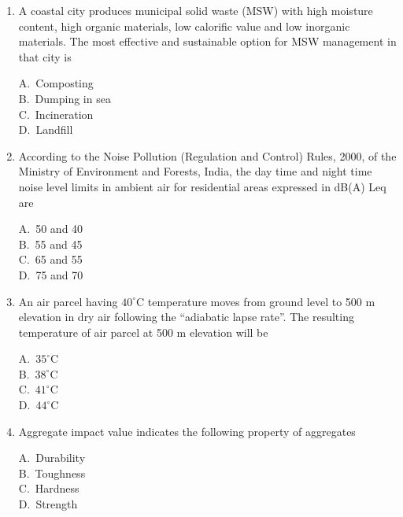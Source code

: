 \documentclass[journal,12pt,onecolumn]{IEEEtran}
\theoremstyle{remark}
\begin{document}
\begin{enumerate}
\noindent\item A coastal city produces municipal solid waste (MSW) with high moisture content, high organic materials, low calorific value and low inorganic materials. The most effective and sustainable option for MSW management in that city is
\hfill{}
\begin{multicols}{4}
A.\ Composting \\
B.\ Dumping in sea \\
C.\ Incineration \\
D.\ Landfill
\end{multicols}

\noindent\item According to the Noise Pollution (Regulation and Control) Rules, 2000, of the Ministry of Environment and Forests, India, the day time and night time noise level limits in ambient air for residential areas expressed in dB(A) Leq are
\hfill{}
\begin{multicols}{4}
A.\ 50 and 40 \\
B.\ 55 and 45 \\
C.\ 65 and 55 \\
D.\ 75 and 70
\end{multicols}

\setlength{\parindent}{0pt}
\setlength{\parskip}{0.5cm}


\noindent\item An air parcel having $40^\circ\mathrm{C}$ temperature moves from ground level to 500 m elevation in dry air following the ``adiabatic lapse rate''. The resulting temperature of air parcel at 500 m elevation will be
\hfill{}
\begin{multicols}{4}
A.\ $35^\circ\mathrm{C}$ \\
B.\ $38^\circ\mathrm{C}$ \\
C.\ $41^\circ\mathrm{C}$ \\
D.\ $44^\circ\mathrm{C}$
\end{multicols}

\noindent\item Aggregate impact value indicates the following property of aggregates
\hfill{}
\begin{multicols}{4}
A.\ Durability \\
B.\ Toughness \\
C.\ Hardness \\
D.\ Strength
\end{multicols}


\end{enumerate}
\end{document}
